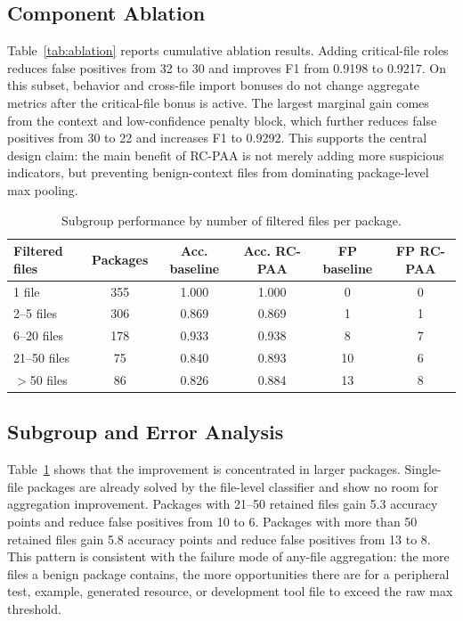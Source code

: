 \documentclass[conference,a4paper]{IEEEtran}
\newcommand{\rcpaa}{RC-PAA}
\begin{document}
\subsection{Component Ablation}
Table~\ref{tab:ablation} reports cumulative ablation results. Adding critical-file
roles reduces false positives from 32 to 30 and improves F1 from 0.9198 to 0.9217.
On this subset, behavior and cross-file import bonuses do not change aggregate metrics
after the critical-file bonus is active. The largest marginal gain comes from the
context and low-confidence penalty block, which further reduces false positives from
30 to 22 and increases F1 to 0.9292. This supports the central design claim: the main
benefit of \rcpaa{} is not merely adding more suspicious indicators, but preventing
benign-context files from dominating package-level max pooling.

\begin{table}[t]
\centering
\caption{Subgroup performance by number of filtered files per package.}
\label{tab:subgroups}
\tiny
\setlength{\tabcolsep}{3pt}
\begin{tabular}{lccccc}
\toprule
Filtered files & Packages & Acc. baseline & Acc. \rcpaa{} & FP baseline & FP \rcpaa{} \\
\midrule
1 file        & 355 & 1.000 & 1.000 & 0  & 0 \\
2--5 files    & 306 & 0.869 & 0.869 & 1  & 1 \\
6--20 files   & 178 & 0.933 & 0.938 & 8  & 7 \\
21--50 files  & 75  & 0.840 & 0.893 & 10 & 6 \\
$>$50 files   & 86  & 0.826 & 0.884 & 13 & 8 \\
\bottomrule
\end{tabular}
\end{table}

\subsection{Subgroup and Error Analysis}
Table~\ref{tab:subgroups} shows that the improvement is concentrated in larger
packages. Single-file packages are already solved by the file-level classifier and
show no room for aggregation improvement. Packages with 21--50 retained files gain
5.3 accuracy points and reduce false positives from 10 to 6. Packages with more than
50 retained files gain 5.8 accuracy points and reduce false positives from 13 to 8.
This pattern is consistent with the failure mode of any-file aggregation: the more
files a benign package contains, the more opportunities there are for a peripheral
test, example, generated resource, or development tool file to exceed the raw max
threshold.
\end{document}

